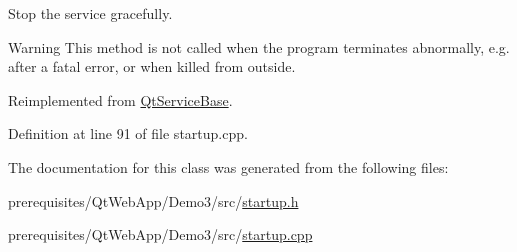 Stop the service gracefully. \begin{DoxyWarning}{Warning}
This method is not called when the program terminates abnormally, e.\+g. after a fatal error, or when killed from outside. 
\end{DoxyWarning}


Reimplemented from \mbox{\hyperlink{class_qt_service_base_a8d52c1b8fd06b50bdc0a0c6f9936a68e}{Qt\+Service\+Base}}.



Definition at line 91 of file startup.\+cpp.



The documentation for this class was generated from the following files\+:\begin{DoxyCompactItemize}
\item 
prerequisites/\+Qt\+Web\+App/\+Demo3/src/\mbox{\hyperlink{startup_8h}{startup.\+h}}\item 
prerequisites/\+Qt\+Web\+App/\+Demo3/src/\mbox{\hyperlink{startup_8cpp}{startup.\+cpp}}\end{DoxyCompactItemize}
